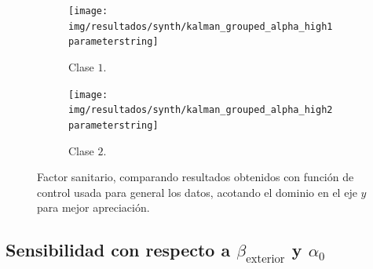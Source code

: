 \begin{figure}[!h]
     \centering
     \begin{subfigure}[b]{\textwidth}
         \centering
         \texttt{[image: img/resultados/synth/kalman\_grouped\_alpha\_high1\\parameterstring]}
         \caption{Clase \(1\).}
     \end{subfigure}
     \hfill
     \begin{subfigure}[b]{\textwidth}
         \centering
         \texttt{[image: img/resultados/synth/kalman\_grouped\_alpha\_high2\\parameterstring]}
         \caption{Clase \(2\).}
     \end{subfigure}
        \caption[Factor sanitario, caso sintético]{Factor sanitario, comparando resultados obtenidos con función de control usada para general los datos, acotando el dominio en el eje \(y\) para mejor apreciación.}
        \label{synth-alpha-comp-high}
\end{figure}


\subsection{Sensibilidad con respecto a \(\beta_{\text{exterior}}\) y \(\alpha_0\)} \label{subsec:sensibeta}

